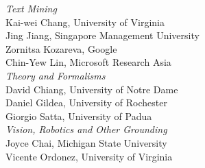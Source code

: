                             \emph{Text Mining} \\
                                    \hspace*{0.2in} Kai-wei Chang, University of Virginia \\
                                    \hspace*{0.2in} Jing Jiang, Singapore Management University \\
                                    \hspace*{0.2in} Zornitsa Kozareva, Google \\
                                    \hspace*{0.2in} Chin-Yew Lin, Microsoft Research Asia \\
                            \emph{Theory and Formalisms} \\
                                    \hspace*{0.2in} David Chiang, University of Notre Dame \\
                                    \hspace*{0.2in} Daniel Gildea, University of Rochester \\
                                    \hspace*{0.2in} Giorgio Satta, University of Padua \\
                            \emph{Vision, Robotics and Other Grounding} \\
                                    \hspace*{0.2in} Joyce Chai, Michigan State University \\
                                    \hspace*{0.2in} Vicente Ordonez, University of Virginia \\

